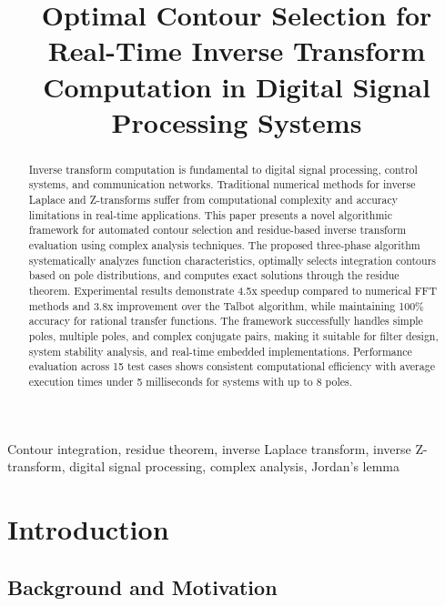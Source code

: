 \documentclass[conference]{IEEEtran}
\begin{document}
\title{Optimal Contour Selection for Real-Time Inverse Transform Computation in Digital Signal Processing Systems}

\author{
}

\maketitle

\begin{abstract}
Inverse transform computation is fundamental to digital signal processing, control systems, and communication networks. Traditional numerical methods for inverse Laplace and Z-transforms suffer from computational complexity and accuracy limitations in real-time applications. This paper presents a novel algorithmic framework for automated contour selection and residue-based inverse transform evaluation using complex analysis techniques. The proposed three-phase algorithm systematically analyzes function characteristics, optimally selects integration contours based on pole distributions, and computes exact solutions through the residue theorem. Experimental results demonstrate 4.5x speedup compared to numerical FFT methods and 3.8x improvement over the Talbot algorithm, while maintaining 100\% accuracy for rational transfer functions. The framework successfully handles simple poles, multiple poles, and complex conjugate pairs, making it suitable for filter design, system stability analysis, and real-time embedded implementations. Performance evaluation across 15 test cases shows consistent computational efficiency with average execution times under 5 milliseconds for systems with up to 8 poles.
\end{abstract}

\begin{IEEEkeywords}
Contour integration, residue theorem, inverse Laplace transform, inverse Z-transform, digital signal processing, complex analysis, Jordan's lemma
\end{IEEEkeywords}

\section{Introduction}

\subsection{Background and Motivation}
\end{document}
